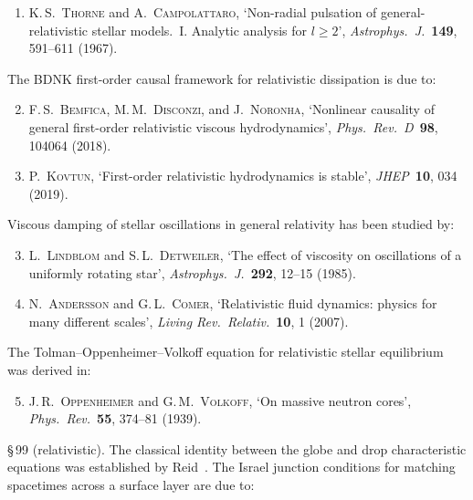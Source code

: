 \begin{enumerate}
\item \textsc{K.\,S.\ Thorne} and \textsc{A.\ Campolattaro},
  `Non-radial pulsation of general-relativistic stellar models.\ I.
  Analytic analysis for $l \geqslant 2$',
  \textit{Astrophys.\ J.}\ \textbf{149}, 591--611 (1967).
\end{enumerate}

\noindent
The BDNK first-order causal framework for relativistic dissipation
is due to:

\begin{enumerate}
\setcounter{enumi}{1}
\item \textsc{F.\,S.\ Bemfica}, \textsc{M.\,M.\ Disconzi},
  and \textsc{J.\ Noronha},
  `Nonlinear causality of general first-order relativistic viscous
  hydrodynamics',
  \textit{Phys.\ Rev.\ D}\ \textbf{98}, 104064 (2018).

\item \textsc{P.\ Kovtun},
  `First-order relativistic hydrodynamics is stable',
  \textit{JHEP}\ \textbf{10}, 034 (2019).
\end{enumerate}

\noindent
Viscous damping of stellar oscillations in general relativity
has been studied by:

\begin{enumerate}
\setcounter{enumi}{2}
\item \textsc{L.\ Lindblom} and \textsc{S.\,L.\ Detweiler},
  `The effect of viscosity on oscillations of a uniformly
  rotating star',
  \textit{Astrophys.\ J.}\ \textbf{292}, 12--15 (1985).

\item \textsc{N.\ Andersson} and \textsc{G.\,L.\ Comer},
  `Relativistic fluid dynamics: physics for many different scales',
  \textit{Living Rev.\ Relativ.}\ \textbf{10}, 1 (2007).
\end{enumerate}

\noindent
The Tolman--Oppenheimer--Volkoff equation for relativistic stellar
equilibrium was derived in:

\begin{enumerate}
\setcounter{enumi}{4}
\item \textsc{J.\,R.\ Oppenheimer} and \textsc{G.\,M.\ Volkoff},
  `On massive neutron cores',
  \textit{Phys.\ Rev.}\ \textbf{55}, 374--81 (1939).
\end{enumerate}

\medskip
\noindent\S\,99 (relativistic).
The classical identity between the globe and drop characteristic
equations was established by Reid~\cite{Reid1960drop}.  The
Israel junction conditions for matching spacetimes across a
surface layer are due to:

